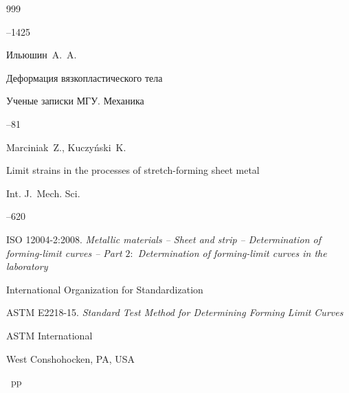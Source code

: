 \begin{thebibliography}{999}

--1425






\by Ильюшин~A.~A.

\paper Деформация вязкопластического тела

\jour Ученые записки МГУ. Механика



--81




\by Marciniak~Z., Kuczy\'nski~K. 

\paper Limit strains in the processes of stretch-forming sheet metal 

\jour  Int. J.~Mech. Sci.




–620





\thesis \rm ISO 12004-2:2008. \it Metallic materials -- Sheet and strip -- Determination of forming-limit curves -- Part $2:$ Determination of forming-limit curves in the laboratory


\publaddr International Organization for Standardization






\thesis \rm ASTM E2218-15. \it  Standard Test Method for Determining Forming Limit Curves


\publ ASTM International

\publaddr West Conshohocken, PA, USA

~pp \nofrills





\end{thebibliography}
